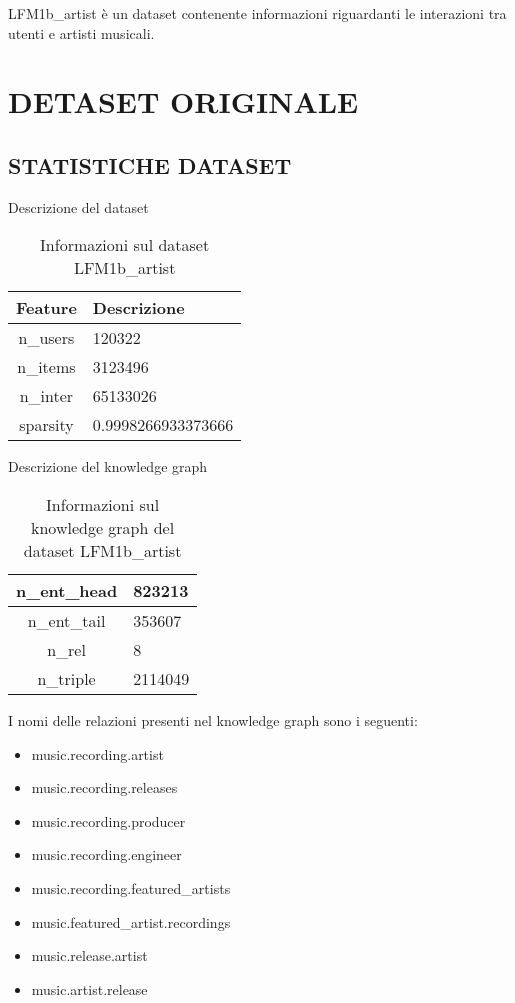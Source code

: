 
\noindent LFM1b\_artist è un dataset contenente informazioni riguardanti le interazioni tra utenti e artisti musicali.

\section*{DETASET ORIGINALE}

\subsection*{STATISTICHE DATASET}


Descrizione del dataset
\begin{table}[H]
    \centering
    \footnotesize
    \begin{tabularx}{\textwidth}{|c|X|}
        \hline
        \textbf{Feature} & \textbf{Descrizione} \\
        \hline
        n\_users & 120322 \\
        \hline
        n\_items & 3123496 \\
        \hline
        n\_inter & 65133026 \\
        \hline
        sparsity & 0.9998266933373666 \\
        \hline
    \end{tabularx}
    \caption{Informazioni sul dataset LFM1b\_artist}
    \label{tab:dataset_info}
\end{table}


\noindent Descrizione del knowledge graph
\begin{table}[H]
    \centering
    \footnotesize
    \begin{tabularx}{\textwidth}{|c|X|}
        \hline
        n\_ent\_head & 823213 \\
        \hline
        n\_ent\_tail & 353607 \\
        \hline
        n\_rel & 8 \\
        \hline
        n\_triple & 2114049 \\
        \hline
    \end{tabularx}
    \caption{Informazioni sul knowledge graph del dataset LFM1b\_artist}
    \label{tab:dataset_info}
\end{table}

\newpage
\noindent I nomi delle relazioni presenti nel knowledge graph sono i seguenti:
\begin{itemize}
    \item music.recording.artist
    \item music.recording.releases
    \item music.recording.producer
    \item music.recording.engineer
    \item music.recording.featured\_artists
    \item music.featured\_artist.recordings
    \item music.release.artist
    \item music.artist.release
\end{itemize}


